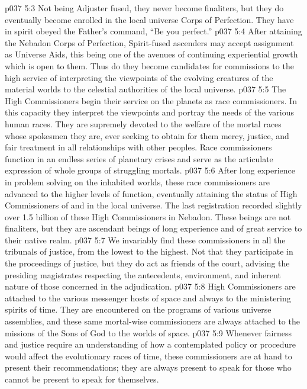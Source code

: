 \vs p037 5:3 Not being Adjuster fused, they never become finaliters, but they do eventually become enrolled in the local universe Corps of Perfection. They have in spirit obeyed the Father’s command, “Be you perfect.”
\vs p037 5:4 \pc After attaining the Nebadon Corps of Perfection, Spirit\hyp{}fused ascenders may accept assignment as Universe Aids, this being one of the avenues of continuing experiential growth which is open to them. Thus do they become candidates for commissions to the high service of interpreting the viewpoints of the evolving creatures of the material worlds to the celestial authorities of the local universe.
\vs p037 5:5 The High Commissioners begin their service on the planets as race commissioners. In this capacity they interpret the viewpoints and portray the needs of the various human races. They are supremely devoted to the welfare of the mortal races whose spokesmen they are, ever seeking to obtain for them mercy, justice, and fair treatment in all relationships with other peoples. Race commissioners function in an endless series of planetary crises and serve as the articulate expression of whole groups of struggling mortals.
\vs p037 5:6 After long experience in problem solving on the inhabited worlds, these race commissioners are advanced to the higher levels of function, eventually attaining the status of High Commissioners of and in the local universe. The last registration recorded slightly over 1.5 billion of these High Commissioners in Nebadon. These beings are not finaliters, but they are ascendant beings of long experience and of great service to their native realm.
\vs p037 5:7 We invariably find these commissioners in all the tribunals of justice, from the lowest to the highest. Not that they participate in the proceedings of justice, but they do act as friends of the court, advising the presiding magistrates respecting the antecedents, environment, and inherent nature of those concerned in the adjudication.
\vs p037 5:8 High Commissioners are attached to the various messenger hosts of space and always to the ministering spirits of time. They are encountered on the programs of various universe assemblies, and these same mortal\hyp{}wise commissioners are always attached to the missions of the Sons of God to the worlds of space.
\vs p037 5:9 Whenever fairness and justice require an understanding of how a contemplated policy or procedure would affect the evolutionary races of time, these commissioners are at hand to present their recommendations; they are always present to speak for those who cannot be present to speak for themselves.
